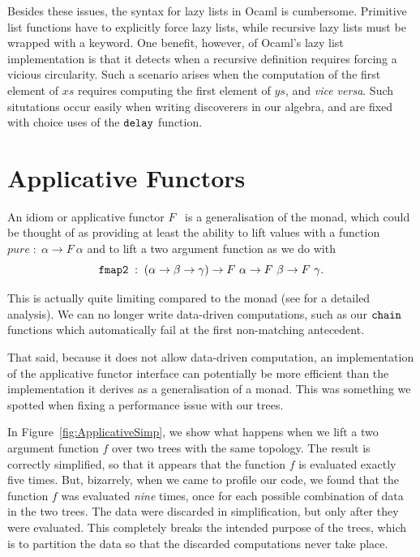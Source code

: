 Besides these issues, the syntax for lazy lists in Ocaml is cumbersome. Primitive list functions have to explicitly force lazy lists, while recursive lazy lists must be wrapped with a  keyword. One benefit, however, of Ocaml's lazy list implementation is that it detects when a recursive definition requires forcing a vicious circularity. Such a scenario arises when the computation of the first element of $xs$ requires computing the first element of $ys$, and \emph{vice versa}. Such situtations occur easily when writing discoverers in our algebra, and are fixed with choice uses of the $\texttt{delay}$ function.

\section{Applicative Functors}\label{sec:Applicative}
An idiom or applicative functor $F$~\cite{Applicative} is a generalisation of the monad, which could be thought of as providing at least the ability to lift values with a function $pure\;:\;\alpha \rightarrow F\ \alpha$ and to lift a two argument function as we do with 
\begin{displaymath}
\texttt{fmap2}\;:\;(\alpha\rightarrow\beta\rightarrow\gamma)\rightarrow F\ \alpha \rightarrow F\ \beta \rightarrow F\ \gamma.
\end{displaymath}

This is actually quite limiting compared to the monad (see \cite{IdiomsArrowsMonads} for a detailed analysis). We can no longer write data-driven computations, such as our $\texttt{chain}$ functions which automatically fail at the first non-matching antecedent.

That said, because it does not allow data-driven computation, an implementation of the applicative functor interface can potentially be more efficient than the implementation it derives as a generalisation of a monad. This was something we spotted when fixing a performance issue with our trees.

In Figure~\ref{fig:ApplicativeSimp}, we show what happens when we lift a two argument function $f$ over two trees with the same topology. The result is correctly simplified, so that it appears that the function $f$ is evaluated exactly five times. But, bizarrely, when we came to profile our code, we found that the function $f$ was evaluated \emph{nine} times, once for each possible combination of data in the two trees. The data were discarded in simplification, but only after they were evaluated. This completely breaks the intended purpose of the trees, which is to partition the data so that the discarded computations never take place.

